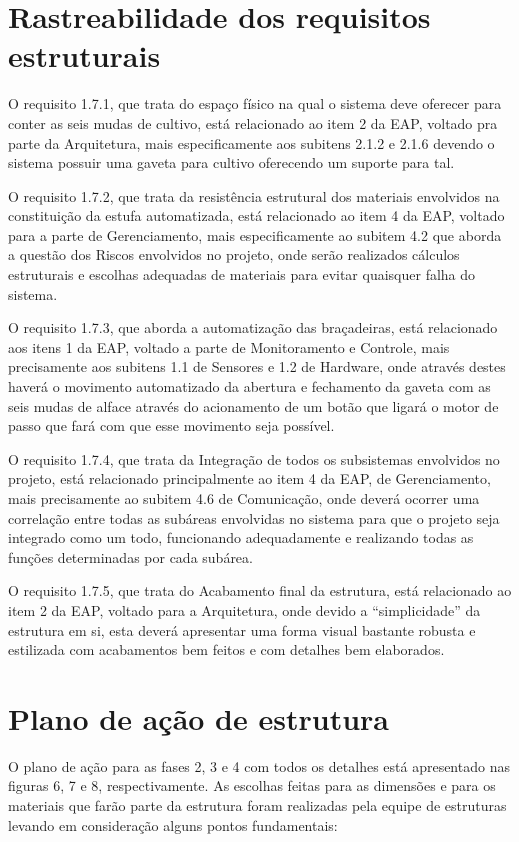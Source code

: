 \section{Rastreabilidade dos requisitos estruturais}

O requisito 1.7.1, que trata do espaço físico na qual o sistema deve oferecer para conter as seis mudas de cultivo, está relacionado  ao item 2 da EAP, voltado pra parte da Arquitetura, mais especificamente aos subitens 2.1.2 e 2.1.6 devendo o sistema possuir uma gaveta para cultivo oferecendo um suporte para tal.

O requisito 1.7.2, que trata da resistência estrutural dos materiais envolvidos na constituição da estufa automatizada, está relacionado ao item 4 da EAP, voltado para a parte de Gerenciamento, mais especificamente ao subitem 4.2 que aborda a questão dos Riscos envolvidos no projeto, onde serão realizados cálculos estruturais e escolhas adequadas de materiais para evitar quaisquer falha do sistema.

O requisito 1.7.3, que aborda a automatização das braçadeiras, está relacionado aos itens 1 da EAP, voltado a parte de Monitoramento e Controle, mais precisamente aos subitens 1.1 de Sensores e 1.2 de Hardware, onde através destes haverá o movimento automatizado da abertura e fechamento da gaveta com as seis mudas de alface através do acionamento de um botão que ligará o motor de passo que fará com que esse movimento seja possível.

O requisito 1.7.4, que trata da Integração de todos os subsistemas envolvidos no projeto, está relacionado principalmente ao item 4 da EAP, de Gerenciamento, mais precisamente ao subitem 4.6 de Comunicação, onde deverá ocorrer uma correlação entre todas as subáreas envolvidas no sistema para que o projeto seja integrado como um todo, funcionando adequadamente e realizando todas as funções determinadas por cada subárea.

O requisito 1.7.5, que trata do Acabamento final da estrutura, está relacionado ao item 2 da EAP, voltado para a Arquitetura, onde devido a “simplicidade” da estrutura em si, esta deverá apresentar uma forma visual bastante robusta e estilizada com acabamentos bem feitos e com detalhes bem elaborados.

\section{Plano de ação de estrutura}

O plano de ação para as fases 2, 3 e 4 com todos os detalhes está apresentado nas figuras 6, 7 e 8, respectivamente. As escolhas feitas para as dimensões e para os materiais que farão parte da estrutura foram realizadas pela equipe de estruturas levando em consideração alguns pontos fundamentais:

